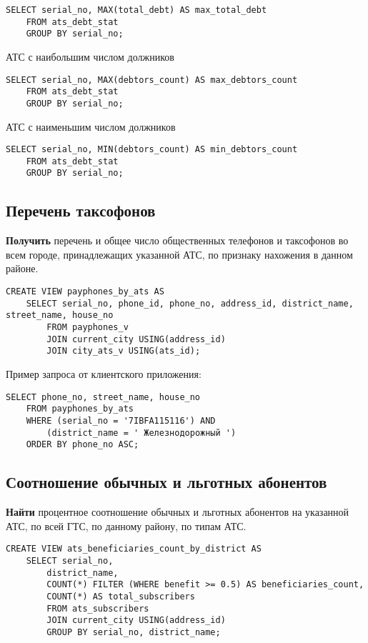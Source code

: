 \documentclass{report}
\begin{document}
\begin{lstlisting}
SELECT serial_no, MAX(total_debt) AS max_total_debt
	FROM ats_debt_stat
	GROUP BY serial_no;
\end{lstlisting}

АТС с наибольшим числом должников

\begin{lstlisting}
SELECT serial_no, MAX(debtors_count) AS max_debtors_count
	FROM ats_debt_stat
	GROUP BY serial_no;
\end{lstlisting}

АТС с наименьшим числом должников

\begin{lstlisting}
SELECT serial_no, MIN(debtors_count) AS min_debtors_count
	FROM ats_debt_stat
	GROUP BY serial_no;
\end{lstlisting}

\subsection{Перечень таксофонов}

\textbf{Получить} перечень и общее число общественных телефонов и 
таксофонов во всем городе, принадлежащих указанной АТС, по признаку 
нахожения в данном районе.

\begin{lstlisting}
CREATE VIEW payphones_by_ats AS
    SELECT serial_no, phone_id, phone_no, address_id, district_name, street_name, house_no
        FROM payphones_v
        JOIN current_city USING(address_id)
        JOIN city_ats_v USING(ats_id);
\end{lstlisting}

Пример запроса от клиентского приложения:

\begin{lstlisting}
SELECT phone_no, street_name, house_no
	FROM payphones_by_ats
	WHERE (serial_no = '7IBFA115116') AND
		(district_name = ' Железнодорожный ')
	ORDER BY phone_no ASC;
\end{lstlisting}

\subsection{Соотношение обычных и льготных абонентов}

\textbf{Найти} процентное соотношение обычных и льготных абонентов 
на указанной АТС, по всей ГТС, по данному району, по типам АТС.

\begin{lstlisting}
CREATE VIEW ats_beneficiaries_count_by_district AS 
    SELECT serial_no,  
        district_name,  
        COUNT(*) FILTER (WHERE benefit >= 0.5) AS beneficiaries_count, 
        COUNT(*) AS total_subscribers
        FROM ats_subscribers
        JOIN current_city USING(address_id)
        GROUP BY serial_no, district_name;
\end{lstlisting}
\end{document}
